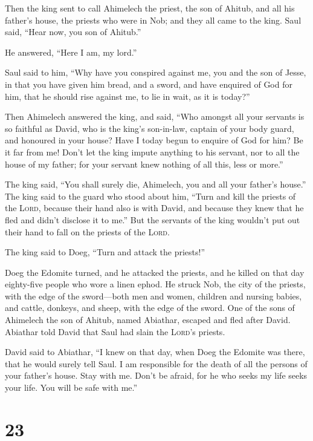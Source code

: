  Then the king sent to call Ahimelech the priest, the son
of Ahitub, and all his father's house, the priests who were in Nob; and
they all came to the king.  Saul said, ``Hear now, you
son of Ahitub.''

He answered, ``Here I am, my lord.''

 Saul said to him, ``Why have you conspired against me,
you and the son of Jesse, in that you have given him bread, and a sword,
and have enquired of God for him, that he should rise against me, to lie
in wait, as it is today?''

 Then Ahimelech answered the king, and said, ``Who
amongst all your servants is so faithful as David, who is the king's
son-in-law, captain of your body guard, and honoured in your house?
 Have I today begun to enquire of God for him? Be it far
from me! Don't let the king impute anything to his servant, nor to all
the house of my father; for your servant knew nothing of all this, less
or more.''

 The king said, ``You shall surely die, Ahimelech, you
and all your father's house.''  The king said to the
guard who stood about him, ``Turn and kill the priests of the
\textsc{Lord}, because their hand also is with David, and because they
knew that he fled and didn't disclose it to me.'' But the servants of
the king wouldn't put out their hand to fall on the priests of the
\textsc{Lord}.

 The king said to Doeg, ``Turn and attack the priests!''

Doeg the Edomite turned, and he attacked the priests, and he killed on
that day eighty-five people who wore a linen ephod.  He
struck Nob, the city of the priests, with the edge of the sword---both
men and women, children and nursing babies, and cattle, donkeys, and
sheep, with the edge of the sword.  One of the sons of
Ahimelech the son of Ahitub, named Abiathar, escaped and fled after
David.  Abiathar told David that Saul had slain the
\textsc{Lord}'s priests.

 David said to Abiathar, ``I knew on that day, when Doeg
the Edomite was there, that he would surely tell Saul. I am responsible
for the death of all the persons of your father's house. 
Stay with me. Don't be afraid, for he who seeks my life seeks your life.
You will be safe with me.''

\hypertarget{section-22}{%
\section{23}\label{section-22}}

